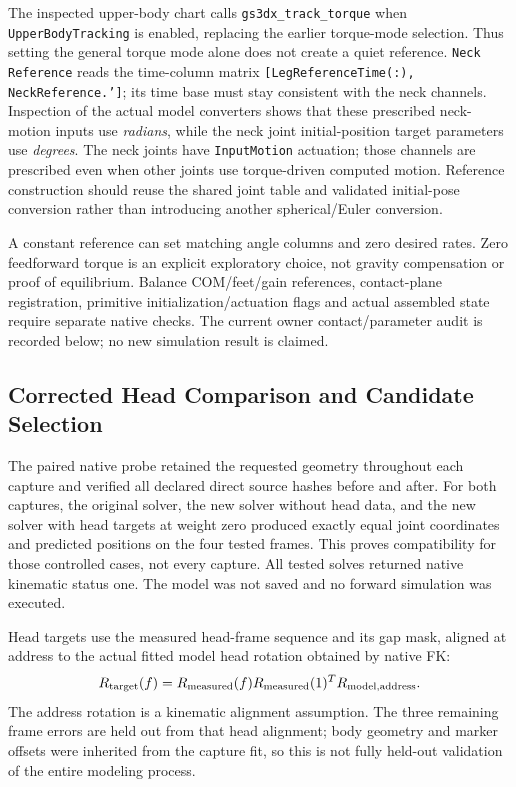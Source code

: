\documentclass[11pt,a4paper]{article}
\begin{document}
The inspected upper-body chart calls \texttt{gs3dx\_track\_torque} when
\texttt{UpperBodyTracking} is enabled, replacing the earlier torque-mode
selection. Thus setting the general torque mode alone does not create a
quiet reference. \texttt{Neck Reference} reads the time-column matrix
\texttt{[LegReferenceTime(:), NeckReference.']}; its time base must stay
consistent with the neck channels. Inspection of the actual model converters
shows that these prescribed neck-motion inputs use \emph{radians}, while
the neck joint initial-position target parameters use \emph{degrees}. The
neck joints have \texttt{InputMotion} actuation; those channels are prescribed
even when other joints use torque-driven computed motion. Reference construction should reuse the
shared joint table and validated initial-pose conversion rather than
introducing another spherical/Euler conversion.

A constant reference can set matching angle columns and zero desired rates.
Zero feedforward torque is an explicit exploratory choice, not gravity
compensation or proof of equilibrium. Balance COM/feet/gain references,
contact-plane registration, primitive initialization/actuation flags and
actual assembled state require separate native checks. The current owner contact/parameter audit is recorded below; no new
simulation result is claimed.


\subsection{Corrected Head Comparison and Candidate Selection}
The paired native probe retained the requested geometry throughout each
capture and verified all declared direct source hashes before and after.
For both captures, the original solver, the new solver without head data,
and the new solver with head targets at weight zero produced exactly equal
joint coordinates and predicted positions on the four tested frames.
This proves compatibility for those controlled cases, not every capture.
All tested solves returned native kinematic status one. The model was not
saved and no forward simulation was executed.

Head targets use the measured head-frame sequence and its gap mask, aligned
at address to the actual fitted model head rotation obtained by native FK:
\[
 R_{\rm target}(f)=R_{\rm measured}(f)
 R_{\rm measured}(1)^T R_{\rm model,address}.
\]
The address rotation is a kinematic alignment assumption. The three
remaining frame errors are held out from that head alignment; body geometry
and marker offsets were inherited from the capture fit, so this is not
fully held-out validation of the entire modeling process.
\end{document}
